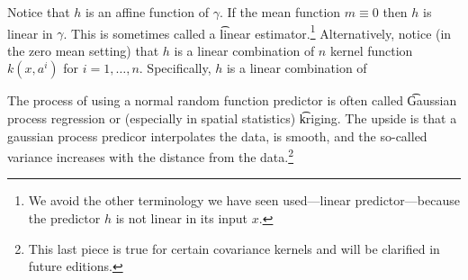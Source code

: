 Notice that $h$ is an affine function of $\gamma $.
If the mean function $m \equiv 0$ then $h$ is linear in $\gamma $.
This is sometimes called a \t{linear estimator}.\footnote{We avoid the other terminology we have seen used---linear predictor---because the predictor $h$ is not linear in its input $x$.}
Alternatively, notice (in the zero mean setting) that $h$ is a linear combination of $n$ kernel function $k(x, a^i)$ for $i = 1, \dots , n$.
Specifically, $h$ is a linear combination of

The process of using a normal random function predictor is often called \t{Gaussian process regression} or (especially in spatial statistics) \t{kriging}.
The upside is that a gaussian process predicor interpolates the data, is smooth, and the so-called variance increases with the distance from the data.\footnote{This last piece is true for certain covariance kernels and will be clarified in future editions.}
